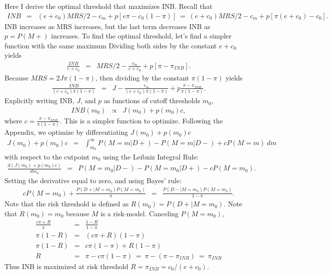 \documentclass[11pt]{article}
\begin{document}
Here I derive the optimal threshold that maximizes INB.  Recall that 
\begin{eqnarray*}
  INB &=& (e+c_0)MRS/2 - c_m + p[e\pi - c_0(1-\pi)]~=~(e+c_0)MRS/2 - c_m + p[\pi(e+c_0) - c_0].
\end{eqnarray*}
INB increases as MRS increases, but the last term decreases INB as $p=P(M+)$ increases.  To find the optimal threshold, let's find a simpler function with the same maximum  Dividing both sides by the constant $e+c_0$ yields
\begin{eqnarray*}
  \frac{INB}{e+c_0} &=& MRS/2 - \frac{c_m}{e+c_0} + p[\pi - \pi_{INB}].
\end{eqnarray*}
Because $MRS=2J\pi(1-\pi)$, then dividing by the constant $\pi(1-\pi)$ yields
\begin{eqnarray*}
  \frac{INB}{(e+c_0)\pi(1-\pi)} &=& J - \frac{c_m}{(e+c_0)\pi(1-\pi)} + p\frac{\pi - \pi_{INB}}{\pi(1-\pi)}.
\end{eqnarray*}
Explicitly writing INB, $J$, and $p$ as functions of cutoff thresholds $m_0$,
\begin{eqnarray*}
  INB(m_0) &\propto& J(m_0) + p(m_0)c,
\end{eqnarray*}
where $c=\frac{\pi - \pi_{INB}}{\pi(1-\pi)}$.  This is a simpler function to optimize.  Following the Appendix, we optimize by
differentiating $J(m_0)+p(m_0)c$ 
\begin{eqnarray*}
	J(m_0)+p(m_0)c &=& \int_{m_0}^\infty P(M=m|D+)-P(M=m|D-)+cP(M=m)~dm
\end{eqnarray*}
with respect to the cutpoint $m_0$ using the Leibniz Integral Rule:
\begin{eqnarray*}
	\frac{d(J(m_0)+p(m_0)c)}{dm_0} &=& P(M=m_0|D-)-P(M=m_0|D+)-cP(M=m_0).
\end{eqnarray*}
Setting the derivative equal to zero, and using Bayes' rule:
\begin{eqnarray*}
  cP(M=m_0)+\frac{P(D+|M=m_0)P(M=m_0)}{\pi} &=& \frac{P(D-|M=m_0)P(M=m_0)}{1-\pi}.
\end{eqnarray*}
Note that the risk threshold is defined as $R(m_0)=P(D+|M=m_0)$.  Note that $R(m_0)=m_0$ because $M$ is a risk-model.  Canceling $P(M=m_0)$, 
\begin{eqnarray*}
	\frac{c\pi+R}{\pi} &=& \frac{1-R}{1-\pi}\\
	\pi(1-R) &=& (c\pi+R)(1-\pi)\\
	\pi(1-R) &=& c\pi(1-\pi) + R(1-\pi)\\
	R &=& \pi - c\pi(1-\pi)~=~ \pi - (\pi-\pi_{INB})~=~\pi_{INB}
\end{eqnarray*}
Thus INB is maximized at risk threshold $R=\pi_{INB}=c_0/(e+c_0)$.
\end{document}
